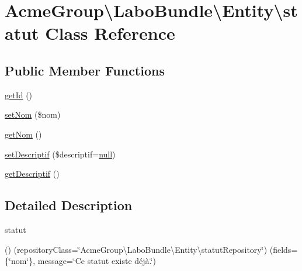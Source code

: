 \hypertarget{class_acme_group_1_1_labo_bundle_1_1_entity_1_1statut}{\section{Acme\+Group\textbackslash{}Labo\+Bundle\textbackslash{}Entity\textbackslash{}statut Class Reference}
\label{class_acme_group_1_1_labo_bundle_1_1_entity_1_1statut}
}
\subsection*{Public Member Functions}
\begin{DoxyCompactItemize}
\item 
\hyperlink{class_acme_group_1_1_labo_bundle_1_1_entity_1_1statut_ad9229ba443b0a320b823d4449257af3d}{get\+Id} ()
\item 
\hyperlink{class_acme_group_1_1_labo_bundle_1_1_entity_1_1statut_ad450597637cae320601f1dbc617a5567}{set\+Nom} (\$nom)
\item 
\hyperlink{class_acme_group_1_1_labo_bundle_1_1_entity_1_1statut_a11c117754d76cdcc4da11065fed8bdd6}{get\+Nom} ()
\item 
\hyperlink{class_acme_group_1_1_labo_bundle_1_1_entity_1_1statut_aa2d41a2d2668c017875b53166c5e743d}{set\+Descriptif} (\$descriptif=\hyperlink{validate_8js_afb8e110345c45e74478894341ab6b28e}{null})
\item 
\hyperlink{class_acme_group_1_1_labo_bundle_1_1_entity_1_1statut_a0006902a7e9a70f14d18fdf46895a2cf}{get\+Descriptif} ()
\end{DoxyCompactItemize}


\subsection{Detailed Description}
statut

() (repository\+Class=\char`\"{}\+Acme\+Group\textbackslash{}\+Labo\+Bundle\textbackslash{}\+Entity\textbackslash{}statut\+Repository\char`\"{}) (fields=\{\char`\"{}nom\char`\"{}\}, message=\char`\"{}\+Ce statut existe déjà.\char`\"{}) 

